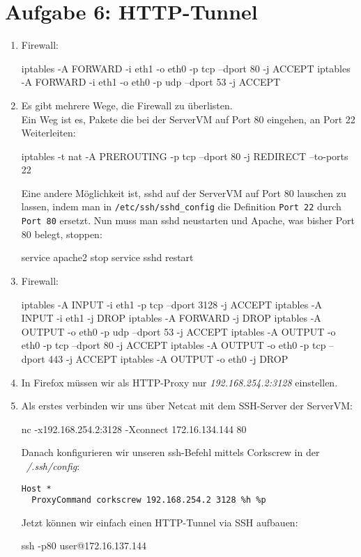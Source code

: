 \documentclass[a4paper,10pt]{scrartcl}
\begin{document}
\section*{Aufgabe 6: HTTP-Tunnel}
\label{sec:Aufgabe 6: HTTP-Tunnel}
\begin{enumerate}[\bfseries 1.]
	\item
        Firewall:
        \begin{rootcommands}
iptables -A FORWARD -i eth1 -o eth0 -p tcp --dport 80 -j ACCEPT
iptables -A FORWARD -i eth1 -o eth0 -p udp --dport 53 -j ACCEPT
		\end{rootcommands}

	\item
        Es gibt mehrere Wege, die Firewall zu überlisten.\\
        Ein Weg ist es, Pakete die bei der ServerVM auf Port 80 eingehen,
        an Port 22 Weiterleiten:
		\begin{rootcommands}
iptables -t nat -A PREROUTING -p tcp --dport 80 -j REDIRECT --to-ports 22
		\end{rootcommands}

        Eine andere Möglichkeit ist, sshd auf der ServerVM auf Port 80 lauschen
        zu lassen, indem man in \texttt{/etc/ssh/sshd\_config} die Definition
        \texttt{Port 22} durch \texttt{Port 80} ersetzt. Nun muss man sshd neustarten
        und Apache, was bisher Port 80 belegt, stoppen:

        \begin{rootcommands}
service apache2 stop
service sshd restart
        \end{rootcommands}

	\item
        Firewall:
	    \begin{rootcommands}
iptables -A INPUT -i eth1 -p tcp --dport 3128 -j ACCEPT
iptables -A INPUT -i eth1 -j DROP
iptables -A FORWARD -j DROP
iptables -A OUTPUT -o eth0 -p udp --dport 53 -j ACCEPT
iptables -A OUTPUT -o eth0 -p tcp --dport 80 -j ACCEPT
iptables -A OUTPUT -o eth0 -p tcp --dport 443 -j ACCEPT
iptables -A OUTPUT -o eth0 -j DROP
	    \end{rootcommands}

	\item
        In Firefox müssen wir als HTTP-Proxy nur \textit{192.168.254.2:3128}
        einstellen.

	\item
        Als erstes verbinden wir uns über Netcat mit dem SSH-Server der ServerVM:
        \begin{usercommands}
nc -x192.168.254.2:3128 -Xconnect 172.16.134.144 80
        \end{usercommands}
		Danach konfigurieren wir unseren ssh-Befehl mittels Corkscrew in der
		\textit{~/.ssh/config}:\\
		\begin{lstlisting}
Host *
  ProxyCommand corkscrew 192.168.254.2 3128 %h %p
		\end{lstlisting}
		Jetzt können wir einfach einen HTTP-Tunnel via SSH aufbauen:
        \begin{usercommands}
ssh -p80 user@172.16.137.144
        \end{usercommands}


\end{enumerate}
\end{document}
